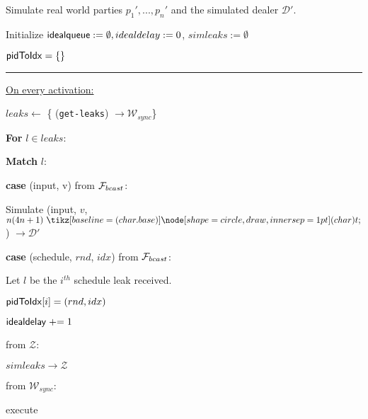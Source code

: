 \begin{bbox}[title={Simulator $\mathcal{S}_{bracha} (\mathcal{D}, \mathcal{P}, \Delta)$}]

Simulate real world parties $p_1',...,p_n'$ and the simulated dealer $\mathcal{D}'$.

Initialize ${\mathsf {idealqueue}} := \emptyset, idealdelay := 0$, $simleaks := \emptyset$

${\mathsf {pidToIdx}} = \{\}$

\vspace{2mm} \hrule \vspace{2mm}

\underline{On every activation:} \vspace{2mm}

\begin{renumerate}
	\item $leaks \leftarrow$ \{ \Send (\texttt{get-leaks}) $\rightarrow \mathcal{W}_{sync}$\}
	
	\item {\bf For} $l \in leaks$:
		\begin{renumerate}
		\item {\bf Match} $l$:
			\begin{renumerate}
				\item {\bf case} (input, v) from $\mathcal{F}_{bcast}$:

					\quad Simulate (input, $v$, $n(4n+1) \token$) $\rightarrow \mathcal{D}'$ 

				\item {\bf case} (schedule, $rnd$, $idx$) from $\mathcal{F}_{bcast}$:

					\quad Let $l$ be the $i^{th}$ schedule leak received.

					\quad ${\mathsf {pidToIdx}}[i] = (rnd, idx)$

					\quad ${\mathsf {idealdelay}} \mathrel{+}= 1$
			\end{renumerate}
		\end{renumerate}
	\end{renumerate}


\OnInput {} from $\mathcal{Z}$:
	\begin{renumerate}
	\item \Send $simleaks \rightarrow \mathcal{Z}$
	\end{renumerate}

\OnInput {} from $\mathcal{W}_{sync}$:
	\begin{renumerate}
	\item execute \msf{Poll}
	\end{renumerate}


\end{bbox}
